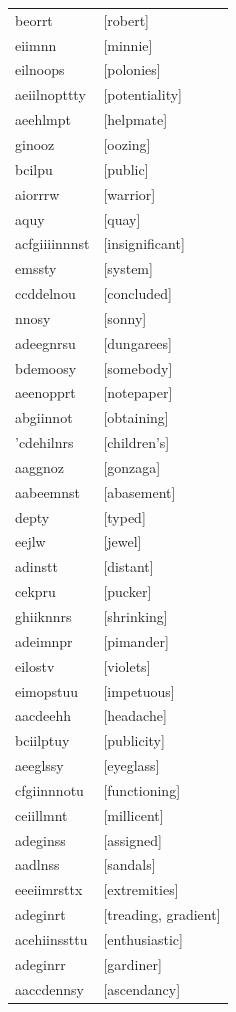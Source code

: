 \documentclass{article}
\begin{document}
\begin{tabular}{ll}
beorrt & [robert] \\
eiimnn & [minnie] \\
eilnoops & [polonies] \\
aeiilnopttty & [potentiality] \\
aeehlmpt & [helpmate] \\
ginooz & [oozing] \\
bcilpu & [public] \\
aiorrrw & [warrior] \\
aquy & [quay] \\
acfgiiiinnnst & [insignificant] \\
emssty & [system] \\
ccddelnou & [concluded] \\
nnosy & [sonny] \\
adeegnrsu & [dungarees] \\
bdemoosy & [somebody] \\
aeenopprt & [notepaper] \\
abgiinnot & [obtaining] \\
'cdehilnrs & [children's] \\
aaggnoz & [gonzaga] \\
aabeemnst & [abasement] \\
depty & [typed] \\
eejlw & [jewel] \\
adinstt & [distant] \\
cekpru & [pucker] \\
ghiiknnrs & [shrinking] \\
adeimnpr & [pimander] \\
eilostv & [violets] \\
eimopstuu & [impetuous] \\
aacdeehh & [headache] \\
bciilptuy & [publicity] \\
aeeglssy & [eyeglass] \\
cfgiinnnotu & [functioning] \\
ceiillmnt & [millicent] \\
adeginss & [assigned] \\
aadlnss & [sandals] \\
eeeiimrsttx & [extremities] \\
adeginrt & [treading, gradient] \\
acehiinssttu & [enthusiastic] \\
adeginrr & [gardiner] \\
aaccdennsy & [ascendancy] \\

\end{tabular}
\end{document}
